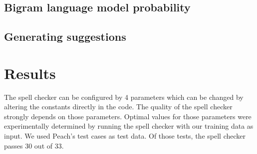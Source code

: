 \documentclass[11pt,a4paper]{article}
\begin{document}
\subsection{Bigram language model probability}
\subsection{Generating suggestions}

\section{Results}
The spell checker can be configured by 4 parameters which can be changed by altering the constants directly in the code. The quality of the spell checker strongly depends on those parameters. Optimal values for those parameters were experimentally determined by running the spell checker with our training data as input. We used Peach's test cases as test data. Of those tests, the spell checker passes 30 out of 33.
\end{document}
